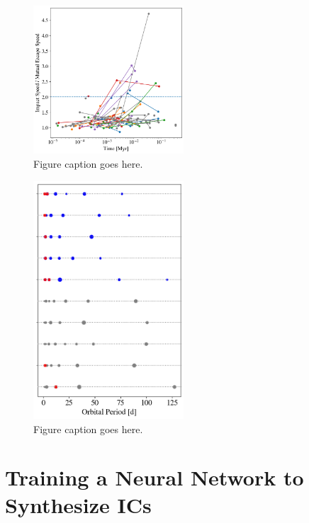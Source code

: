 \begin{figure}
\begin{center}
    \includegraphics[width=0.5\textwidth]{figures/stip/impact_iso_comp.png}
    \caption{Figure caption goes here.\label{fig:impact_iso_comp}}
\end{center}
\end{figure}

\begin{figure}
\begin{center}
    \includegraphics[width=0.5\textwidth]{figures/stip/architectures_iso_comp.png}
    \caption{Figure caption goes here.\label{fig:architectures_iso_comp}}
\end{center}
\end{figure}

\section{Training a Neural Network to Synthesize ICs} \label{sec:neuralICs}

